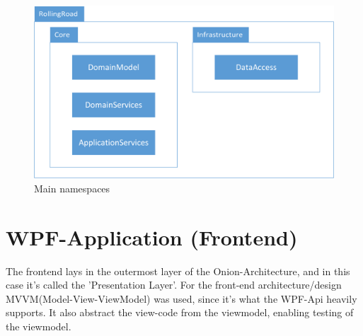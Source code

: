 \begin{figure}
	\centering
	\includegraphics[width=0.7\linewidth]{Images/Namespaces}
	\caption{Main namespaces}
	\label{fig:Namespaces}
\end{figure}

\section{WPF-Application (Frontend)}

The frontend lays in the outermost layer of the Onion-Architecture, and in this case it's called the 'Presentation Layer'. For the front-end architecture/design MVVM(Model-View-ViewModel) was used, since it's what the WPF-Api heavily supports. It also abstract the view-code from the viewmodel, enabling testing of the viewmodel.